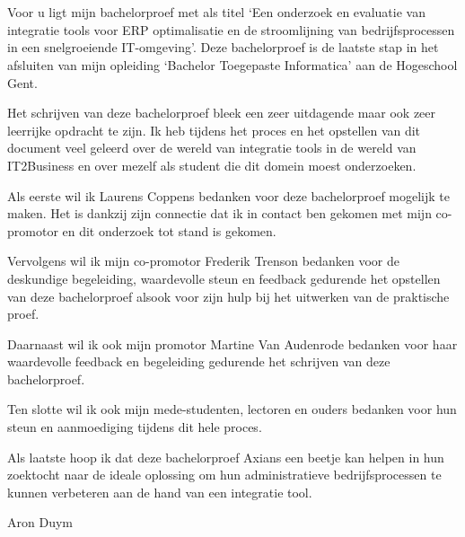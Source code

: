 
\chapter*{}%
\label{ch:voorwoord}


Voor u ligt mijn bachelorproef met als titel ‘Een onderzoek en evaluatie van integratie tools voor ERP optimalisatie en de stroomlijning van bedrijfsprocessen in een snelgroeiende IT-omgeving’. Deze bachelorproef is de laatste stap in het afsluiten van mijn opleiding ‘Bachelor Toegepaste Informatica’ aan de Hogeschool Gent.

\vspace{\baselineskip}

Het schrijven van deze bachelorproef bleek een zeer uitdagende maar ook zeer leerrijke opdracht te zijn. Ik heb tijdens het proces en het opstellen van dit document veel geleerd over de wereld van integratie tools in de wereld van IT2Business en over mezelf als student die dit domein moest onderzoeken.

\vspace{\baselineskip}

Als eerste wil ik Laurens Coppens bedanken voor deze bachelorproef mogelijk te maken. Het is dankzij zijn connectie dat ik in contact ben gekomen met mijn co-promotor en dit onderzoek tot stand is gekomen.

\vspace{\baselineskip}

Vervolgens wil ik mijn co-promotor Frederik Trenson bedanken voor de deskundige begeleiding, waardevolle steun en feedback gedurende het opstellen van deze bachelorproef alsook voor zijn hulp bij het uitwerken van de praktische proef.

\vspace{\baselineskip}

Daarnaast wil ik ook mijn promotor Martine Van Audenrode bedanken voor haar waardevolle feedback en begeleiding gedurende het schrijven van deze bachelorproef.

\vspace{\baselineskip}

Ten slotte wil ik ook mijn mede-studenten, lectoren en ouders bedanken voor hun steun en aanmoediging tijdens dit hele proces.

\vspace{\baselineskip}

Als laatste hoop ik dat deze bachelorproef Axians een beetje kan helpen in hun zoektocht naar de ideale oplossing om hun administratieve bedrijfsprocessen te kunnen verbeteren aan de hand van een integratie tool.

\vspace{\baselineskip}

Aron Duym
